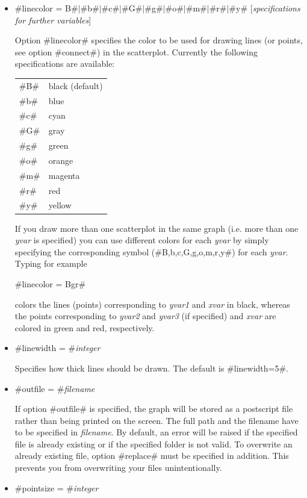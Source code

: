 \begin{itemize}
 \item #linecolor = B#$|$#b#$|$#c#$|$#G#$|$#g#$|$#o#$|$#m#$|$#r#$|$#y# [{\em specifications
for further variables}]

Option #linecolor# specifies the color to be used for drawing
lines (or points, see option #connect#) in the scatterplot.
Currently the following specifications are available:

\begin{tabular}{ll}
#B# & black (default) \\
#b# & blue \\
#c# & cyan \\
#G# & gray \\
#g# & green \\
#o# & orange \\
#m# & magenta \\
#r# & red \\
#y# & yellow \\
\end{tabular}

If you draw more than one scatterplot in the same graph (i.e. more
than one {\em yvar} is specified) you can use different colors for
each {\em yvar} by simply specifying the corresponding symbol
(#B,b,c,G,g,o,m,r,y#) for each {\em yvar}. Typing for example

#linecolor = Bgr#

colors the lines (points) corresponding to {\em yvar1} and {\em
xvar} in black, whereas the points corresponding to {\em yvar2}
and {\em yvar3} (if specified) and {\em xvar} are colored in green
and red, respectively.

\item #linewidth = #{\em integer}

Specifies how thick lines should be drawn. The default is
#linewidth=5#.

\item #outfile = #{\em filename}

If option #outfile# is specified, the graph will be stored as a
postscript file rather than being printed on the screen. The full
path and the filename have to be specified in {\em filename}. By
default, an error will be raised if the specified file is already
existing or if the specified folder is not valid. To overwrite an
already existing file, option #replace# must be specified in
addition. This prevents you from overwriting your files
unintentionally.

\item #pointsize = #{\em integer}


\end{itemize}
